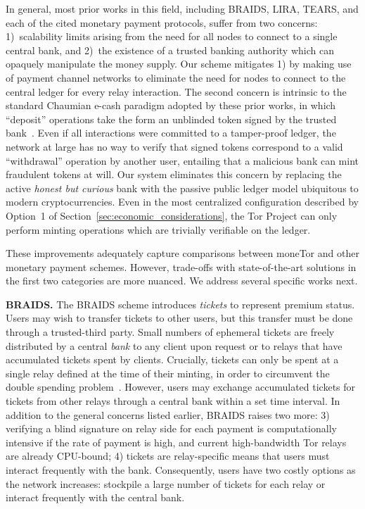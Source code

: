 In general, most prior works in this field, including BRAIDS, LIRA, TEARS, and each of the cited monetary payment protocols, suffer from two concerns: 1)~scalability limits arising from the need for all nodes to connect to a single central bank, and 2)~the existence of a trusted banking authority which can opaquely manipulate the money supply.
Our scheme mitigates 1) by making use of payment channel networks to eliminate the need for nodes to connect to the central ledger for every relay interaction.
The second concern is intrinsic to the standard Chaumian e-cash paradigm adopted by these prior works, in which ``deposit'' operations take the form an unblinded token signed by the trusted bank~\cite{chaum1988untraceable}.
Even if all interactions were committed to a tamper-proof ledger, the network at large has no way to verify that signed tokens correspond to a valid ``withdrawal'' operation by another user, entailing that a malicious bank can mint fraudulent tokens at will.
Our system eliminates this concern by replacing the active \emph{honest but curious} bank with the passive public ledger model ubiquitous to modern cryptocurrencies.
Even in the most centralized configuration described by Option~1 of Section~\ref{sec:economic_considerations}, the Tor Project can only perform minting operations which are trivially verifiable on the ledger.

These improvements adequately capture comparisons between moneTor and other monetary payment schemes.
However, trade-offs with state-of-the-art solutions in the first two categories are more nuanced.
We address several specific works next.

\medskip\noindent\textbf{BRAIDS.}
The BRAIDS scheme introduces \emph{tickets} to represent premium status.
Users may wish to transfer tickets to other users, but this transfer must be done through a trusted-third party.
Small numbers of ephemeral tickets are freely distributed by a central \emph{bank} to any client upon request or to relays that have accumulated tickets spent by clients.
Crucially, tickets can only be spent at a single relay defined at the time of their minting, in order to circumvent the double spending problem~\cite{jansen2010recruiting}.
However, users may exchange accumulated tickets for tickets from other relays through a central bank within a set time interval.
In addition to the general concerns listed earlier, BRAIDS raises two more: 3) verifying a blind signature on relay side for each payment is computationally intensive if the rate of payment is high, and current high-bandwidth Tor relays are already CPU-bound; 4) tickets are relay-specific means that users must interact frequently with the bank.
Consequently, users have two costly options as the network increases: stockpile a large number of tickets for each relay or interact frequently with the central bank.

